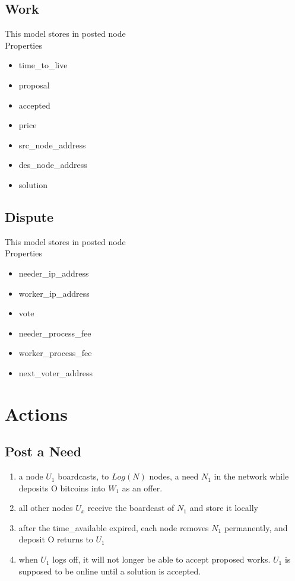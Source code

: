 \documentclass[12pt]{article}
\begin{document}
\subsection{Work}
This model stores in posted node\\
Properties
\begin{itemize}
	\item time\_to\_live
	\item proposal
	\item accepted
	\item price
	\item src\_node\_address
	\item des\_node\_address
	\item solution
\end{itemize}

\subsection{Dispute}
This model stores in posted node\\
Properties
\begin{itemize}
	\item needer\_ip\_address
	\item worker\_ip\_address
	\item vote
	\item needer\_process\_fee
	\item worker\_process\_fee
	\item next\_voter\_address
\end{itemize}

\section{Actions}

\subsection{Post a Need}
\begin{enumerate}
	\item a node $U_1$ boardcasts, to $Log(N)$ nodes, a need $N_1$ in the network while deposits O bitcoins into $W_1$ as an offer.
	\item all other nodes $U_x$ receive the boardcast of $N_1$ and store it locally
	\item after the time\_available expired, each node removes $N_1$ permanently, and deposit O returns to $U_1$
	\item when $U_1$ logs off, it will not longer be able to accept proposed works. $U_1$ is supposed to be online until a solution is accepted.  
\end{enumerate}
\end{document}

